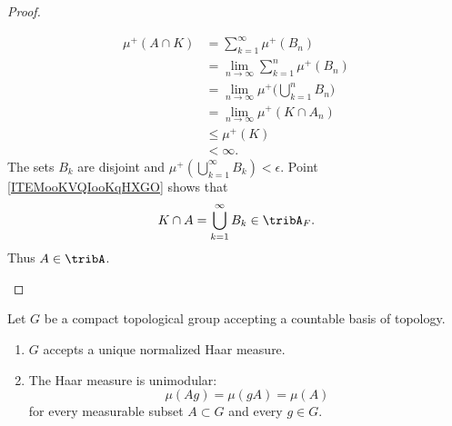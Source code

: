 \begin{proof}
\begin{subproof}
\begin{subequations}
\begin{align}
                \mu^+(A\cap K)&=\sum_{k=1}^{\infty}\mu^+(B_n)\\
                &=\lim_{n\to \infty} \sum_{k=1}^n\mu^+(B_n)\\
                &=\lim_{n\to \infty} \mu^+\big( \bigcup_{k=1}^nB_n \big)\\
                &=\lim_{n\to \infty} \mu^+(K\cap A_n)\\
                &\leq \mu^+(K)\\
                &<\infty.
                \end{align}
            \end{subequations}
            The sets \( B_k\) are disjoint and \( \mu^+(\bigcup_{k=1}^{\infty}B_k)<\epsilon\). Point \ref{ITEMooKVQIooKqHXGO} shows that
            \begin{equation}
                K\cap A=\bigcup_{k=1}^{\infty}B_k\in\tribA_F.
            \end{equation}
            Thus \( A\in \tribA\).
    \end{subproof}
\end{proof}



\begin{theorem} \label{ThoBZBooOTxqcI}
    Let \( G\) be a compact topological group accepting a countable basis of topology.
    \begin{enumerate}
        \item
            \( G\) accepts a unique normalized Haar measure.
        \item
            The Haar measure is unimodular:
	\begin{equation}
		\mu(Ag)=\mu(gA)=\mu(A)
	\end{equation}
    for every measurable subset \( A\subset G\) and every \( g\in G\).
    \end{enumerate}
\end{theorem}


